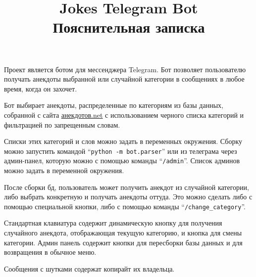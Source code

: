 \documentclass{article}
\author{}
\title{Jokes Telegram Bot \protect\\ Пояснительная записка \vspace{-4.3em}}
\date{}
\begin{document}
\setlength{\parskip}{\baselineskip}%

\maketitle

Проект является ботом для мессенджера Telegram.
Бот позволяет пользователю получать анекдоты выбранной или случайной категории в сообщениях в любое время, когда он захочет.

Бот выбирает анекдоты, распределенные по категориям из базы данных, собранной с сайта \underline{\href{https://anekdotov.net}{анекдотов.net}} с использованием черного списка категорий и фильтрацией по запрещенным словам.

Списки этих категорий и слов можно задать в переменных окружения.
Сборку можно запустить командой ``\verb+python -m bot.parser+'' или из телеграма через админ-панел, которую можно с помощью команды ``\verb+/admin+''.
Список админов можно задать в переменной окружения.

После сборки бд, пользователь может получить анекдот из случайной категории, либо выбрать конкретную и получать анекдоты оттуда.
Это можно сделать либо с помощью специальной кнопки, либо с помощью команды ``\verb+/change_category+''.

Стандартная клавиатура содержит динамическую кнопку для получения случайного анекдота, отображающая текущую категорию, и кнопка для смены категории.
Админ панель содержит кнопки для пересборки базы данных и для возвращения в обычное меню.

Сообщения с шутками содержат копирайт их владельца.
\end{document}
